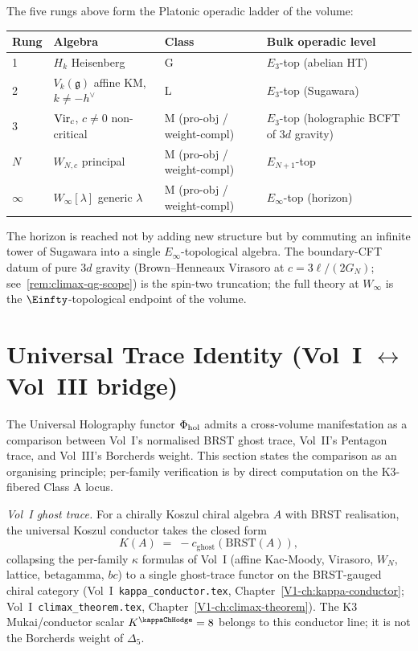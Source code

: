 \begin{remark}
The five rungs above form the Platonic operadic ladder of the
volume:
\begin{center}
\begin{tabular}{l|l|l|l}
Rung & Algebra & Class & Bulk operadic level \\
\hline
1 & $H_{k}$ Heisenberg & G & $E_{3}$-top (abelian HT) \\
2 & $V_{k}(\mathfrak{g})$ affine KM, $k \neq -h^{\vee}$ & L & $E_{3}$-top (Sugawara) \\
3 & $\mathrm{Vir}_{c}$, $c \neq 0$ non-critical & M (pro-obj / weight-compl) & $E_{3}$-top (holographic BCFT of $3d$ gravity) \\
$N$ & $W_{N, c}$ principal & M (pro-obj / weight-compl) & $E_{N+1}$-top \\
$\infty$ & $W_{\infty}[\lambda]$ generic $\lambda$ & M (pro-obj / weight-compl) & $E_{\infty}$-top (horizon) \\
\end{tabular}
\end{center}
The horizon is reached not by adding new structure but by
commuting an infinite tower of Sugawara into a single
$E_{\infty}$-topological algebra. The boundary-CFT datum of pure
$3d$ gravity (Brown--Henneaux Virasoro at
$c = 3\ell/(2G_{N})$; see~\cref{rem:climax-qg-scope}) is the
spin-two truncation; the full theory at $W_{\infty}$ is the
$\Einfty$-topological endpoint of the volume.
\end{remark}

\section{Universal Trace Identity (Vol~I $\leftrightarrow$ Vol~III bridge)}
\label{sec:universal-trace-identity}

The Universal Holography functor $\Phi_{\mathrm{hol}}$ admits a cross-volume
manifestation as a comparison between Vol~I's normalised BRST ghost
trace, Vol~II's Pentagon trace, and Vol~III's Borcherds weight. This
section states the comparison as an organising principle; per-family
verification is by direct computation on the K3-fibered Class A locus.

\emph{Vol~I ghost trace.} For a chirally Koszul chiral
algebra $A$ with BRST realisation, the universal Koszul conductor
takes the closed form
\[
 K(A) \;=\; - c_{\mathrm{ghost}}(\mathrm{BRST}(A)),
\]
collapsing the per-family $\kappa$ formulas of Vol~I (affine
Kac-Moody, Virasoro, $W_{N}$, lattice, betagamma, $bc$) to a single
ghost-trace functor on the BRST-gauged chiral category
(Vol~I~\texttt{kappa\_conductor.tex},
Chapter~\ref{V1-ch:kappa-conductor};
Vol~I~\texttt{climax\_theorem.tex},
Chapter~\ref{V1-ch:climax-theorem}). The K3 Mukai/conductor scalar
$K^{\kappaChHodge}=8$ belongs to this conductor line; it is
not the Borcherds weight of $\Delta_5$.

